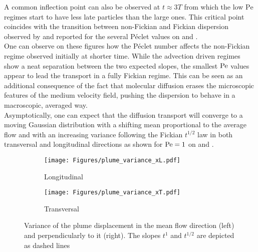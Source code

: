 A common inflection point can also be observed at $t\approx3T$ from which the low $\mathrm{Pe}$ regimes start to have less late particles than the large ones.
This critical point coincides with the transition between non-Fickian and Fickian dispersion observed by \citet[Fig. 2]{Meyer2016} and reported for the several Péclet values on  and .\\
One can observe on these figures how the Péclet number affects the non-Fickian regime observed initially at shorter time.
While the advection driven regimes show a neat separation between the two expected slopes, the smallest $\mathrm{Pe}$ values appear to lead the transport in a fully Fickian regime. 
This can be seen as an additional consequence of the fact that molecular diffusion erases the microscopic features of the medium velocity field, pushing the dispersion to behave in a macroscopic, averaged way.\\
Asymptotically, one can expect that the diffusion transport will converge to a moving Gaussian distribution with a shifting mean proportional to the average flow and with an increasing variance following the Fickian $t^{1/2}$ law in both transversal and longitudinal directions as shown for $\mathrm{Pe} = 1$ on  and .\\

\begin{figure}[h!]
	\centering
	\begin{subfigure}[b]{.49\textwidth}
		\centering
		\texttt{[image: Figures/plume\_variance\_xL.pdf]}
		\caption{Longitudinal}
		\label{fig:plume_variance_xL}
	\end{subfigure}
	\hfill
	\begin{subfigure}[b]{0.49\textwidth}
		\centering
		\texttt{[image: Figures/plume\_variance\_xT.pdf]}
		\caption{Transversal}
		\label{fig:plume_variance_xT}
	\end{subfigure}
\caption{Variance of the plume displacement in the mean flow direction (left) and perpendicularly to it (right). The slopes $t^1$ and $t^{1/2}$ are depicted as dashed lines}
\end{figure}


